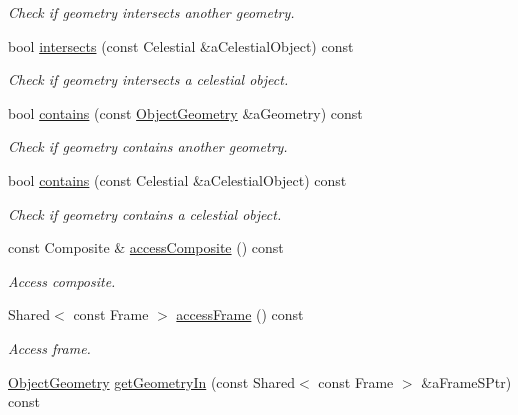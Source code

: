 \begin{DoxyCompactItemize}
\begin{DoxyCompactList}\small\item\em Check if geometry intersects another geometry. \end{DoxyCompactList}\item 
bool \hyperlink{classostk_1_1simulation_1_1component_1_1_geometry_a954a8a7af85cde7d9407b98ac9dd23c5}{intersects} (const Celestial \&a\+Celestial\+Object) const
\begin{DoxyCompactList}\small\item\em Check if geometry intersects a celestial object. \end{DoxyCompactList}\item 
bool \hyperlink{classostk_1_1simulation_1_1component_1_1_geometry_af39e2376a527720e37e46dc57f3eb6a5}{contains} (const \hyperlink{namespaceostk_1_1simulation_1_1component_a911837ab7e6f8471e9927a74795a0077}{Object\+Geometry} \&a\+Geometry) const
\begin{DoxyCompactList}\small\item\em Check if geometry contains another geometry. \end{DoxyCompactList}\item 
bool \hyperlink{classostk_1_1simulation_1_1component_1_1_geometry_ade44921582930e30c598dbeba365f528}{contains} (const Celestial \&a\+Celestial\+Object) const
\begin{DoxyCompactList}\small\item\em Check if geometry contains a celestial object. \end{DoxyCompactList}\item 
const Composite \& \hyperlink{classostk_1_1simulation_1_1component_1_1_geometry_a1a225b42f1350dfe4cca7937dddbf2b9}{access\+Composite} () const
\begin{DoxyCompactList}\small\item\em Access composite. \end{DoxyCompactList}\item 
Shared$<$ const Frame $>$ \hyperlink{classostk_1_1simulation_1_1component_1_1_geometry_afed7aa31b6b37090e90a7723af33f346}{access\+Frame} () const
\begin{DoxyCompactList}\small\item\em Access frame. \end{DoxyCompactList}\item 
\hyperlink{namespaceostk_1_1simulation_1_1component_a911837ab7e6f8471e9927a74795a0077}{Object\+Geometry} \hyperlink{classostk_1_1simulation_1_1component_1_1_geometry_a39ea10b795b8732bafc20ee0fb9df962}{get\+Geometry\+In} (const Shared$<$ const Frame $>$ \&a\+Frame\+S\+Ptr) const

\end{DoxyCompactItemize}
